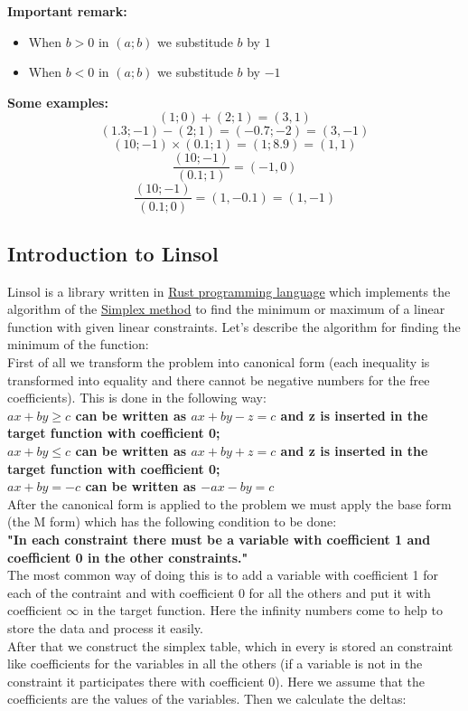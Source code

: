 \documentclass[]{article}
\begin{document}
			\Large{\textbf{Important remark: }}
			\begin{itemize}
				\item When $b>0$ in $ (a; b)$ we substitude $b$ by $1$
				\item When $b<0$ in $ (a; b)$ we substitude $b$ by $-1$
			\end{itemize}
			\textbf{Some examples:}
			$$ (1; 0) + (2; 1) = (3, 1)$$
			$$ (1.3; -1) - (2; 1) = (-0.7; -2) = (3, -1)$$
			$$ (10; -1) \times (0.1; 1) = (1; 8.9) = (1, 1)$$
			$$ \frac{(10; -1)}{(0.1; 1)} = (-1, 0)$$
			$$ \frac{(10; -1)}{(0.1; 0)} = (1, -0.1) = (1, -1)$$
		\subsection{Introduction to Linsol}
			Linsol is a library written in  \href{https://www.rust-lang.org/en-US/}{Rust programming language} which implements the algorithm of the \href{https://en.wikipedia.org/wiki/Simplex_algorithm}{Simplex method} to find the minimum or maximum of a linear function with given linear constraints.
			Let's describe the algorithm for finding the minimum of the function:\\
			First of all we transform the problem into canonical form (each inequality is transformed into equality and there cannot be negative numbers for the free coefficients). This is done in the following way:\\
			\textbf{$ ax + by \geq c$ can be written as $ax + by - z = c$ and z is inserted in the target function with coefficient 0;\\
			$ ax + by \leq c$ can be written as $ax + by + z = c$ and z is inserted in the target function with coefficient 0;\\
			$ ax + by = -c$ can be written as $-ax - by = c$}\\
			After the canonical form is applied to the problem we must apply the base form (the M form) which has the following condition to be done:\\
			\textbf{"In each constraint there must be a variable with coefficient 1 and coefficient 0 in the other constraints."}\\
			The most common way of doing this is to add a variable with coefficient 1 for each of the contraint and with coefficient 0 for all the others and put it with coefficient $\infty$ in the target function. Here the infinity numbers come to help to store the data and process it easily.\\
			After that we construct the simplex table, which in every is stored an constraint like coefficients for the variables in all the others (if a variable is not in the constraint it participates there with coefficient 0). Here we assume that the coefficients are the values of the variables. Then we calculate the deltas:
\end{document}
